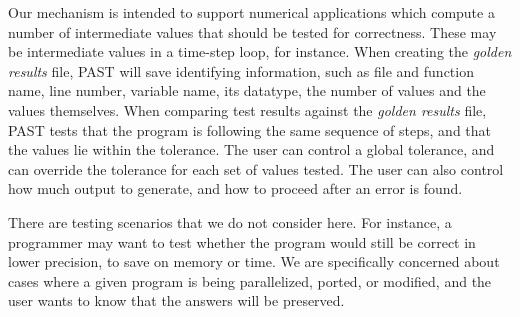 Our mechanism is intended to support numerical applications which compute a number of intermediate values that should be tested for correctness.
These may be intermediate values in a time-step loop, for instance.
When creating the \emph{golden results} file, PAST will save identifying information, such as file and function name, line number, variable name, its datatype, the number of values and the values themselves.
When comparing test results against the \emph{golden results} file, PAST tests that the program is following the same sequence of steps, and that the values lie within the tolerance.
The user can control a global tolerance, and can override the tolerance for each set of values tested.
The user can also control how much output to generate, and how to proceed after an error is found.

There are testing scenarios that we do not consider here.
For instance, a programmer may want to test whether the program would still be correct in lower precision, to save on memory or time.
We are specifically concerned about cases where a given program is being parallelized, ported, or modified, and the user wants to know that the answers will be preserved.

